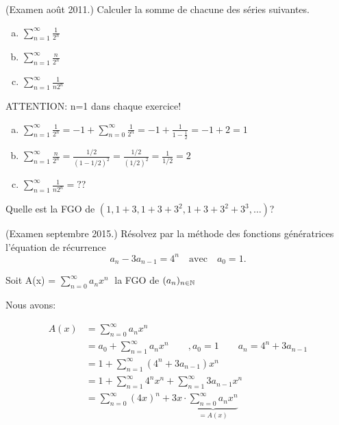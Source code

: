 \newpage


\begin{exo} (Examen ao\^ut 2011.) 
Calculer la somme de chacune des s\'eries suivantes.
%
\begin{enumerate}[a)]
\item $\displaystyle \sum_{n=1}^\infty \frac{1}{2^n}$
\item $\displaystyle \sum_{n=1}^\infty \frac{n}{2^n}$
\item $\displaystyle \sum_{n=1}^\infty \frac{1}{n 2^n}$ 
\end{enumerate}
\end{exo}

ATTENTION: n=1 dans chaque exercice!

\begin{enumerate}[a)]
\item $\displaystyle \sum_{n=1}^\infty \frac{1}{2^n} = -1 + \sum_{n=0}^\infty \frac{1}{2^n}= -1 + \frac{1}{1-\frac{1}{2}} = -1 + 2 = 1 $
\item $\displaystyle \sum_{n=1}^\infty \frac{n}{2^n} = \frac{1/2}{ (1-1/2)^2 } = \frac{1/2}{(1/2)^2} = \frac{1}{1/2} = 2$
\item $\displaystyle \sum_{n=1}^\infty \frac{1}{n 2^n} = ??$ 
\end{enumerate}


\begin{exo}
Quelle est la FGO de $(1,1+3,1+3+3^2,1+3+3^2+3^3,\ldots)$?
\end{exo}

\newpage

\begin{exo} (Examen septembre 2015.)
R\'esolvez par la m\'ethode des fonctions g\'en\'eratrices l'\'equation de r\'ecurrence 
\[
a_n-3a_{n-1}=4^n \quad \mathrm{avec} \quad a_0=1.
\]
\end{exo}

Soit A(x) = $\sum_{n=0}^{\infty} a_n x^n \;$ la FGO de $(a_n)_{n\in \mathbb{N}}$

Nous avons:

\begin{align*}
A(x) &= \sum_{n=0}^{\infty} a_n x^n \\
	&= a_0 + \sum_{n=1}^{\infty} a_n x^n \qquad,a_0 = 1 \qquad a_n = 4^n + 3a_{n-1} \\
	&= 1 + \sum_{n=1}^{\infty} (4^n + 3a_{n-1}) x^n \\
	&= 1 + \sum_{n=1}^{\infty} 4^n x^n + \sum_{n=1}^{\infty} 3a_{n-1} x^n \\
	&= \sum_{n=0}^{\infty} (4x)^n + 3x \cdot \underbrace{\sum_{n=0}^{\infty} a_n x^n}_{=A(x)}
\end{align*}

